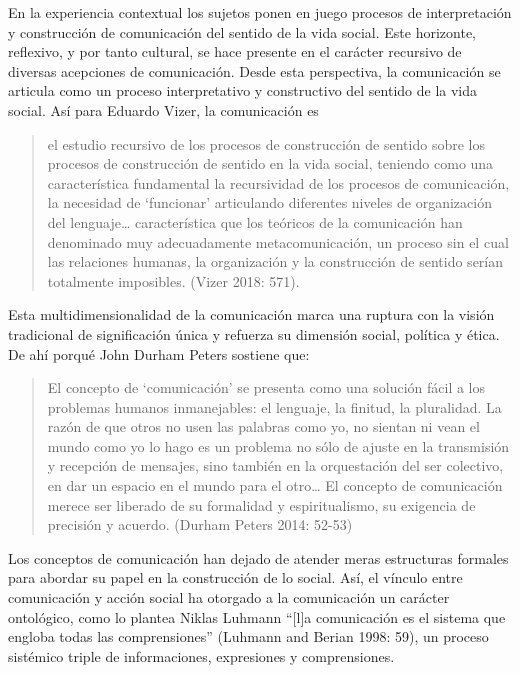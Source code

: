 \documentclass[
]{interact}
\begin{document}
En la experiencia contextual los sujetos ponen en juego procesos de
interpretación y construcción de comunicación del sentido de la vida
social. Este horizonte, reflexivo, y por tanto cultural, se hace
presente en el carácter recursivo de diversas acepciones de
comunicación. Desde esta perspectiva, la comunicación se articula como
un proceso interpretativo y constructivo del sentido de la vida social.
Así para Eduardo Vizer, la comunicación es

\begin{quote}
el estudio recursivo de los procesos de construcción de sentido sobre
los procesos de construcción de sentido en la vida social, teniendo como
una característica fundamental la recursividad de los procesos de
comunicación, la necesidad de `funcionar' articulando diferentes niveles
de organización del lenguaje\ldots{} característica que los teóricos de
la comunicación han denominado muy adecuadamente metacomunicación, un
proceso sin el cual las relaciones humanas, la organización y la
construcción de sentido serían totalmente imposibles. (Vizer 2018: 571).
\end{quote}

Esta multidimensionalidad de la comunicación marca una ruptura con la
visión tradicional de significación única y refuerza su dimensión
social, política y ética. De ahí porqué John Durham Peters sostiene que:

\begin{quote}
El concepto de `comunicación' se presenta como una solución fácil a los
problemas humanos inmanejables: el lenguaje, la finitud, la pluralidad.
La razón de que otros no usen las palabras como yo, no sientan ni vean
el mundo como yo lo hago es un problema no sólo de ajuste en la
transmisión y recepción de mensajes, sino también en la orquestación del
ser colectivo, en dar un espacio en el mundo para el otro\ldots{} El
concepto de comunicación merece ser liberado de su formalidad y
espiritualismo, su exigencia de precisión y acuerdo. (Durham Peters
2014: 52-53)
\end{quote}

Los conceptos de comunicación han dejado de atender meras estructuras
formales para abordar su papel en la construcción de lo social. Así, el
vínculo entre comunicación y acción social ha otorgado a la comunicación
un carácter ontológico, como lo plantea Niklas Luhmann ``{[}l{]}a
comunicación es el sistema que engloba todas las comprensiones''
(Luhmann and Berian 1998: 59), un proceso sistémico triple de
informaciones, expresiones y comprensiones.
\end{document}
